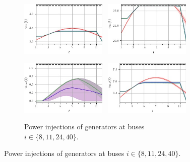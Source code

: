 \documentclass[final,3p,times,twocolumn]{elsarticle}  %
\begin{document}
\begin{figure}
	\centering
	
    \begin{subfigure}[c]{\figwidth}
        \centering
        \includegraphics[width=0.45\textwidth]{figures/time series/case300_volatile/gen_u_4108.jpg}~
    	\includegraphics[width=0.45\textwidth]{figures/time series/case300_volatile/gen_u_4111.jpg}%
    	
        \includegraphics[width=0.45\textwidth]{figures/time series/case300_volatile/gen_u_4124.jpg}~
    	\includegraphics[width=0.45\textwidth]{figures/time series/case300_volatile/gen_u_4140.jpg}%
    	\vspace{-2mm}	
    	\caption{Power injections of generators at buses $i \in \{8,11,24,40\}$.}
    \end{subfigure}
    
    

\end{figure}
\end{document}
